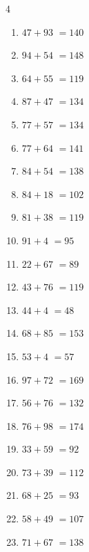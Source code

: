 \begin{multicols}{4}
\begin{enumerate}
  \item $47+93$
        $=140$

  \item $94+54$
        $=148$

  \item $64+55$
        $=119$

  \item $87+47$
        $=134$

  \item $77+57$
        $=134$

  \item $77+64$
        $=141$

  \item $84+54$
        $=138$

  \item $84+18$
        $=102$

  \item $81+38$
        $=119$

  \item $91+4$
        $=95$

  \item $22+67$
        $=89$

  \item $43+76$
        $=119$

  \item $44+4$
        $=48$

  \item $68+85$
        $=153$

  \item $53+4$
        $=57$

  \item $97+72$
        $=169$

  \item $56+76$
        $=132$

  \item $76+98$
        $=174$

  \item $33+59$
        $=92$

  \item $73+39$
        $=112$

  \item $68+25$
        $=93$

  \item $58+49$
        $=107$

  \item $71+67$
        $=138$

\columnbreak %


\end{enumerate}
\end{multicols}

